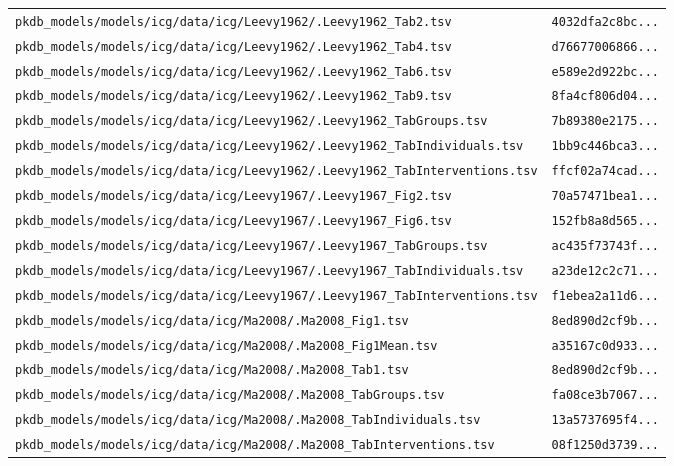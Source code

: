 \documentclass{article}
\begin{document}
\begin{longtable}{ll}
\texttt{pkdb\_models/models/icg/data/icg/Leevy1962/.Leevy1962\_Tab2.tsv} & \texttt{4032dfa2c8bc...} \\
\texttt{pkdb\_models/models/icg/data/icg/Leevy1962/.Leevy1962\_Tab4.tsv} & \texttt{d76677006866...} \\
\texttt{pkdb\_models/models/icg/data/icg/Leevy1962/.Leevy1962\_Tab6.tsv} & \texttt{e589e2d922bc...} \\
\texttt{pkdb\_models/models/icg/data/icg/Leevy1962/.Leevy1962\_Tab9.tsv} & \texttt{8fa4cf806d04...} \\
\texttt{pkdb\_models/models/icg/data/icg/Leevy1962/.Leevy1962\_TabGroups.tsv} & \texttt{7b89380e2175...} \\
\texttt{pkdb\_models/models/icg/data/icg/Leevy1962/.Leevy1962\_TabIndividuals.tsv} & \texttt{1bb9c446bca3...} \\
\texttt{pkdb\_models/models/icg/data/icg/Leevy1962/.Leevy1962\_TabInterventions.tsv} & \texttt{ffcf02a74cad...} \\
\texttt{pkdb\_models/models/icg/data/icg/Leevy1967/.Leevy1967\_Fig2.tsv} & \texttt{70a57471bea1...} \\
\texttt{pkdb\_models/models/icg/data/icg/Leevy1967/.Leevy1967\_Fig6.tsv} & \texttt{152fb8a8d565...} \\
\texttt{pkdb\_models/models/icg/data/icg/Leevy1967/.Leevy1967\_TabGroups.tsv} & \texttt{ac435f73743f...} \\
\texttt{pkdb\_models/models/icg/data/icg/Leevy1967/.Leevy1967\_TabIndividuals.tsv} & \texttt{a23de12c2c71...} \\
\texttt{pkdb\_models/models/icg/data/icg/Leevy1967/.Leevy1967\_TabInterventions.tsv} & \texttt{f1ebea2a11d6...} \\
\texttt{pkdb\_models/models/icg/data/icg/Ma2008/.Ma2008\_Fig1.tsv} & \texttt{8ed890d2cf9b...} \\
\texttt{pkdb\_models/models/icg/data/icg/Ma2008/.Ma2008\_Fig1Mean.tsv} & \texttt{a35167c0d933...} \\
\texttt{pkdb\_models/models/icg/data/icg/Ma2008/.Ma2008\_Tab1.tsv} & \texttt{8ed890d2cf9b...} \\
\texttt{pkdb\_models/models/icg/data/icg/Ma2008/.Ma2008\_TabGroups.tsv} & \texttt{fa08ce3b7067...} \\
\texttt{pkdb\_models/models/icg/data/icg/Ma2008/.Ma2008\_TabIndividuals.tsv} & \texttt{13a5737695f4...} \\
\texttt{pkdb\_models/models/icg/data/icg/Ma2008/.Ma2008\_TabInterventions.tsv} & \texttt{08f1250d3739...} \\

\end{longtable}
\end{document}
